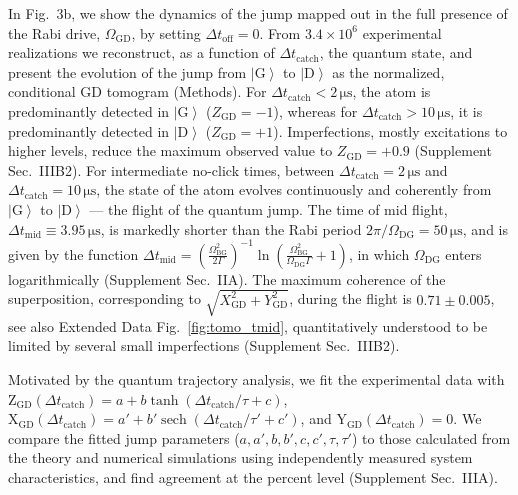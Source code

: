 \documentclass[
	 			preprint,     		superscriptaddress, 																longbibliography,
		amsmath, amssymb,
		aps,  prb,   		floatfix,
		linenumbers     
	]{revtex4-1}
\newcommand{\ket}[1]{\left|#1\right>}
\begin{document}
In Fig.~3b, we show the dynamics of the jump mapped out in the full presence of the Rabi drive, $\Omega_\mathrm{GD}$, by setting $\Delta t_\mathrm{off}=0$. 
From $3.4\times10^{6}$ experimental realizations we reconstruct, as a function of $\Delta t_{\operatorname{catch}}$,  the quantum state, and present the evolution of the jump from $\ket{\mathrm{G}}$ to $\ket{\mathrm{D}}$ as the normalized, conditional GD tomogram (Methods).
For $\Delta t_{\operatorname{catch}} < 2\, \mathrm{\mu s}$, the atom is  predominantly detected in $\ket{\mathrm{G}}$ ($Z_\mathrm{GD} = -1$),  whereas for $\Delta t_{\operatorname{catch}}  > 10\, \mathrm{\mu s}$, it is predominantly detected in $\ket{\mathrm{D}}$  ($Z_\mathrm{GD} = +1$). 
Imperfections, mostly excitations to higher levels, reduce the maximum observed value to $Z_\mathrm{GD} = +0.9$ (Supplement Sec.~IIIB2). 
For intermediate no-click times, between $ \Delta  t_{\operatorname{catch}} =2 \, \mathrm{\mu s}$ and $\Delta t_{\operatorname{catch}} = 10\, \mathrm{\mu s}$, the state of the atom evolves  continuously and coherently from $\ket{\mathrm{G}}$ to $\ket{\mathrm{D}}$ ---  the  flight of the quantum jump. 
The time of mid flight,  $\Delta t_\mathrm{mid} \equiv 3.95\, \mathrm{\mu s}$, is markedly shorter than the Rabi period $2\pi/\Omega_\mathrm{DG} = 50\,  \mathrm{\mu s}$, and is given by the  function $ 
\Delta t_{\text{mid}}=\left(\frac{\Omega_\mathrm{BG}^{2}}{2\Gamma}\right)^{-1}\ln\left(\frac{\Omega_\mathrm{BG}^{2}}{\Omega_\mathrm{DG} \Gamma}+1\right)
$, in which $\Omega_\mathrm{DG}$ enters logarithmically (Supplement Sec.~IIA). 
The maximum coherence of the superposition, corresponding to $\sqrt{X_\mathrm{GD}^2 + Y_\mathrm{GD}^2}$, during the flight is $0.71 \pm 0.005$, see also Extended Data Fig.~\ref{fig:tomo_tmid}, quantitatively understood to be limited by several small imperfections (Supplement Sec.~IIIB2). 

Motivated by the quantum trajectory analysis, we fit the experimental data with
 $\mathrm{Z}_\text{GD}(\Delta t_{\operatorname{catch}} ) = a +b \tanh( \Delta t_{\operatorname{catch}}/\tau + c) $, 
$\mathrm{X}_\text{GD}(\Delta t_{\operatorname{catch}} ) = a' +b' \operatorname{sech}(\Delta t_{\operatorname{catch}}/\tau' + c') $, and $\mathrm{Y}_\text{GD}(\Delta t_{\operatorname{catch}} ) =  0$. 
We compare the fitted jump parameters ($a,a',b,b',c,c',\tau,\tau'$) to those 
calculated from the theory and numerical simulations using independently measured system characteristics, and find agreement at the percent level (Supplement Sec.~IIIA). 
\end{document}
